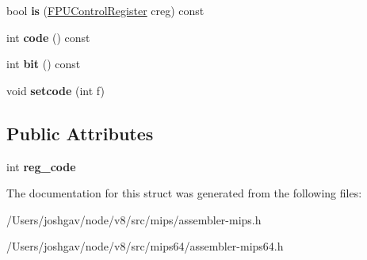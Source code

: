 \begin{DoxyCompactItemize}
\item 
bool {\bfseries is} (\hyperlink{structv8_1_1internal_1_1_f_p_u_control_register}{F\+P\+U\+Control\+Register} creg) const \hypertarget{structv8_1_1internal_1_1_f_p_u_control_register_ac12c8d836cbbd28cf417a283274ff492}{}\label{structv8_1_1internal_1_1_f_p_u_control_register_ac12c8d836cbbd28cf417a283274ff492}

\item 
int {\bfseries code} () const \hypertarget{structv8_1_1internal_1_1_f_p_u_control_register_a46550cd8bfdb91fd17b7cba2d01f8ddf}{}\label{structv8_1_1internal_1_1_f_p_u_control_register_a46550cd8bfdb91fd17b7cba2d01f8ddf}

\item 
int {\bfseries bit} () const \hypertarget{structv8_1_1internal_1_1_f_p_u_control_register_acb95921927dfbe2706be0c686dc883be}{}\label{structv8_1_1internal_1_1_f_p_u_control_register_acb95921927dfbe2706be0c686dc883be}

\item 
void {\bfseries setcode} (int f)\hypertarget{structv8_1_1internal_1_1_f_p_u_control_register_a6f06c7ced9e245e228cc87cd9549984a}{}\label{structv8_1_1internal_1_1_f_p_u_control_register_a6f06c7ced9e245e228cc87cd9549984a}

\end{DoxyCompactItemize}
\subsection*{Public Attributes}
\begin{DoxyCompactItemize}
\item 
int {\bfseries reg\+\_\+code}\hypertarget{structv8_1_1internal_1_1_f_p_u_control_register_a435ea2a706f1ef1da23ff4abb2dd1313}{}\label{structv8_1_1internal_1_1_f_p_u_control_register_a435ea2a706f1ef1da23ff4abb2dd1313}

\end{DoxyCompactItemize}


The documentation for this struct was generated from the following files\+:\begin{DoxyCompactItemize}
\item 
/\+Users/joshgav/node/v8/src/mips/assembler-\/mips.\+h\item 
/\+Users/joshgav/node/v8/src/mips64/assembler-\/mips64.\+h\end{DoxyCompactItemize}
